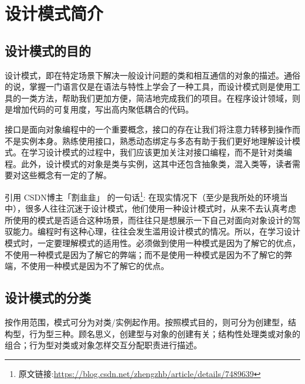 
\section{设计模式简介}
\subsection{设计模式的目的}

设计模式，即在特定场景下解决一般设计问题的类和相互通信的对象的描述。通俗的说，掌握一门语言仅是在语法与特性上学会了一种工具，而设计模式则是使用工具的一类方法，帮助我们更加方便，简洁地完成我们的项目。在程序设计领域，则是增加代码的可复用度，写出高内聚低耦合的代码。

接口是面向对象编程中的一个重要概念，接口的存在让我们将注意力转移到操作而不是实例本身。熟练使用接口，熟悉动态绑定与多态有助于我们更好地理解设计模式。在学习设计模式的过程中，我们应该更加关注对接口编程，而不是针对类编程。此外，设计模式的对象是类与实例，这其中还包含抽象类，混入类等，读者需要对这些概念有一定的了解。

引用 CSDN博主「割韭韭」 的一句话\footnote{原文链接:\url{https://blog.csdn.net/zhengzhb/article/details/7489639}}:
在现实情况下（至少是我所处的环境当中），很多人往往沉迷于设计模式，他们使用一种设计模式时，从来不去认真考虑所使用的模式是否适合这种场景，而往往只是想展示一下自己对面向对象设计的驾驭能力。编程时有这种心理，往往会发生滥用设计模式的情况。所以，在学习设计模式时，一定要理解模式的适用性。必须做到使用一种模式是因为了解它的优点，不使用一种模式是因为了解它的弊端；而不是使用一种模式是因为不了解它的弊端，不使用一种模式是因为不了解它的优点。


\subsection{设计模式的分类}

按作用范围，模式可分为对类/实例起作用。按照模式目的，则可分为创建型，结构型，行为型三种。顾名思义，创建型与对象的创建有关；结构性处理类或对象的组合；行为型对类或对象怎样交互分配职责进行描述。

